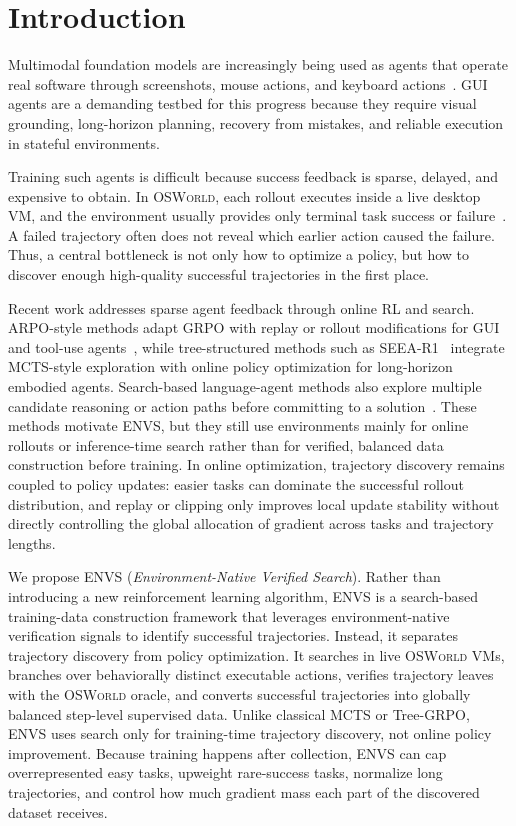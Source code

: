 \documentclass[11pt]{article}
\begin{document}
\section{Introduction}
Multimodal foundation models are increasingly being used as agents that operate real software through screenshots, mouse actions, and keyboard actions~\citep{cheng2024seeclick,hong2023cogagent,zhang2024screenagent,qin2025uitars}. GUI agents are a demanding testbed for this progress because they require visual grounding, long-horizon planning, recovery from mistakes, and reliable execution in stateful environments.

Training such agents is difficult because success feedback is sparse, delayed, and expensive to obtain. In \textsc{OSWorld}, each rollout executes inside a live desktop VM, and the environment usually provides only terminal task success or failure~\citep{xie2024osworld}. A failed trajectory often does not reveal which earlier action caused the failure. Thus, a central bottleneck is not only how to optimize a policy, but how to discover enough high-quality successful trajectories in the first place.

Recent work addresses sparse agent feedback through online RL and search. ARPO-style methods adapt GRPO with replay or rollout modifications for GUI and tool-use agents~\citep{lu2025arpo_gui,dong2025agentic_arpo,qian2025toolrl,wang2025ragen}, while tree-structured methods such as SEEA-R1~\citep{tian2025seea} integrate MCTS-style exploration with online policy optimization for long-horizon embodied agents. Search-based language-agent methods also explore multiple candidate reasoning or action paths before committing to a solution~\citep{yao2023treeofthoughts,koh2024tree_search_lm_agents,putta2024agentq}. These methods motivate ENVS, but they still use environments mainly for online rollouts or inference-time search rather than for verified, balanced data construction before training. In online optimization, trajectory discovery remains coupled to policy updates: easier tasks can dominate the successful rollout distribution, and replay or clipping only improves local update stability without directly controlling the global allocation of gradient across tasks and trajectory lengths.

We propose \textsc{ENVS} (\emph{Environment-Native Verified Search}). Rather than introducing a new reinforcement learning algorithm, \textsc{ENVS} is a search-based training-data construction framework that leverages environment-native verification signals to identify successful trajectories. Instead, it separates trajectory discovery from policy optimization. It searches in live \textsc{OSWorld} VMs, branches over behaviorally distinct executable actions, verifies trajectory leaves with the \textsc{OSWorld} oracle, and converts successful trajectories into globally balanced step-level supervised data. Unlike classical MCTS or Tree-GRPO, \textsc{ENVS} uses search only for training-time trajectory discovery, not online policy improvement. Because training happens after collection, \textsc{ENVS} can cap overrepresented easy tasks, upweight rare-success tasks, normalize long trajectories, and control how much gradient mass each part of the discovered dataset receives. 
\end{document}
